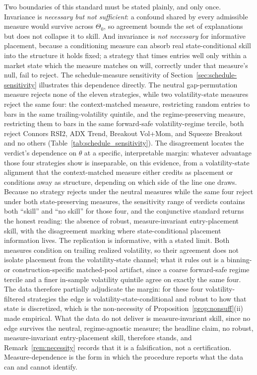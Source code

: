 \documentclass[preprint,12pt]{elsarticle}
\theoremstyle{definition}
\begin{document}
Two boundaries of this standard must be stated plainly, and only once. Invariance is
\emph{necessary but not sufficient}: a confound shared by every admissible measure
would survive across $\Theta_0$, so agreement bounds the set of explanations but does
not collapse it to skill. And invariance is \emph{not necessary} for informative
placement, because a conditioning measure can absorb real state-conditional skill into
the structure it holds fixed; a strategy that times entries well only within a market
state which the measure matches on will, correctly under that measure's null, fail to
reject. The schedule-measure sensitivity of Section~\ref{sec:schedule-sensitivity}
illustrates this dependence directly. The neutral gap-permutation measure rejects none
of the eleven strategies, while two volatility-state measures reject the same four: the context-matched measure, restricting random
entries to bars in the same trailing-volatility quintile, and the regime-preserving measure, restricting them to bars in the same forward-safe volatility-regime tercile, both reject Connors RSI2,
ADX Trend, Breakout Vol+Mom, and Squeeze Breakout and no others (Table~\ref{tab:schedule_sensitivity}). The disagreement locates the
verdict's dependence on $\theta$ at a specific, interpretable margin: whatever
advantage those four strategies show is inseparable, on this evidence, from a
volatility-state alignment that the context-matched measure either credits as
placement or conditions away as structure, depending on which side of the line one
draws. Because no strategy rejects under the neutral measures while the same four reject under both state-preserving measures, the sensitivity range of
verdicts contains both ``skill'' and ``no skill'' for those four, and the conjunctive
standard returns the honest reading: the absence of robust, measure-invariant
entry-placement skill, with the disagreement marking where state-conditional
placement information lives. The replication is informative, with a stated limit. Both measures condition on trailing realized volatility, so their agreement does not isolate placement from the volatility-state channel; what it rules out is a binning- or construction-specific matched-pool artifact, since a coarse forward-safe regime tercile and a finer in-sample volatility quintile agree on exactly the same four. The data therefore partially adjudicate the margin: for these four volatility-filtered strategies the edge is volatility-state-conditional and robust to how that state is discretized, which is the non-necessity of Proposition~\ref{prop:nonsuff}(ii) made empirical. What the data do not deliver is measure-invariant skill, since no edge survives the neutral, regime-agnostic measure; the headline claim, no robust, measure-invariant entry-placement skill, therefore stands, and Remark~\ref{rem:necessity} records that it is a falsification, not a certification. Measure-dependence is the form in which the procedure reports what the
data can and cannot identify.
\end{document}
